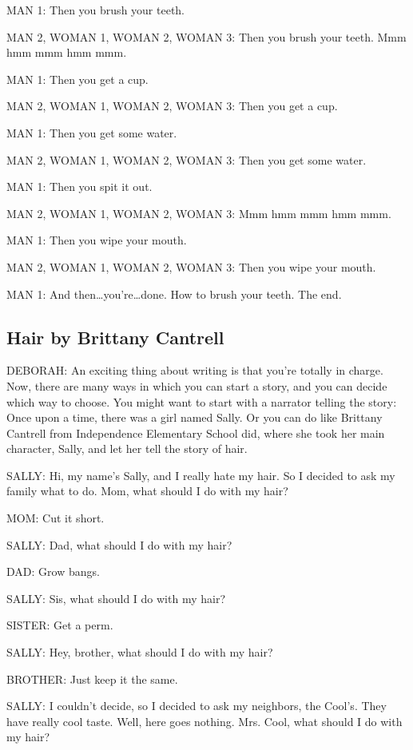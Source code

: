 MAN 1:
Then you brush your teeth.

MAN 2, WOMAN 1, WOMAN 2, WOMAN 3:
Then you brush your teeth.
Mmm hmm mmm hmm mmm.

MAN 1:
Then you get a cup.

MAN 2, WOMAN 1, WOMAN 2, WOMAN 3:
Then you get a cup.

MAN 1:
Then you get some water.

MAN 2, WOMAN 1, WOMAN 2, WOMAN 3:
Then you get some water.

MAN 1:
Then you spit it out.

MAN 2, WOMAN 1, WOMAN 2, WOMAN 3:
Mmm hmm mmm hmm mmm.

MAN 1:
Then you wipe your mouth.

MAN 2, WOMAN 1, WOMAN 2, WOMAN 3:
Then you wipe your mouth.

MAN 1:
And then\dots you're\dots done.
How to brush your teeth.
The end.

\subsection{Hair by Brittany Cantrell}

DEBORAH:
An exciting thing about writing is that you're totally in charge.
Now, there are many ways in which you can start a story, and you can decide which way to choose.
You might want to start with a narrator telling the story:
Once upon a time, there was a girl named Sally.
Or you can do like Brittany Cantrell from Independence Elementary School did, where she took her main character, Sally, and let her tell the story of hair.

SALLY:
Hi, my name's Sally, and I really hate my hair.
So I decided to ask my family what to do.
Mom, what should I do with my hair?

MOM:
Cut it short.

SALLY:
Dad, what should I do with my hair?

DAD:
Grow bangs.

SALLY:
Sis, what should I do with my hair?

SISTER:
Get a perm.

SALLY:
Hey, brother, what should I do with my hair?

BROTHER:
Just keep it the same.

SALLY:
I couldn't decide, so I decided to ask my neighbors, the Cool's.
They have really cool taste.
Well, here goes nothing.
Mrs. Cool, what should I do with my hair?

